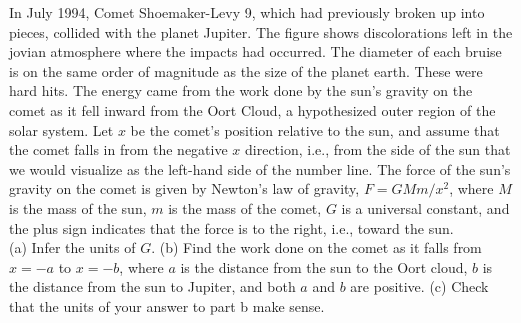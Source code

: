 In July 1994, Comet Shoemaker-Levy 9, which had previously broken up into pieces,
collided with the planet Jupiter.
The figure shows discolorations left in the jovian atmosphere where the impacts
had occurred. The diameter of each bruise is on the same order of magnitude as
the size of the planet earth. These were hard hits. The energy came from the work
done by the sun's gravity on the comet as it fell inward from the Oort Cloud, a
hypothesized outer region of the solar system. Let $x$ be the comet's position
relative to the sun, and assume that the comet falls in from the negative $x$ direction,
i.e., from the side of the sun that we would visualize as the left-hand side of the
number line. 
The force of the sun's gravity on the comet is given by Newton's law of gravity,
$F = GMm/x^2$,
where $M$ is the mass of the sun, $m$ is the mass of the comet,
$G$ is a universal constant, and the plus sign indicates that the force is
to the right, i.e., toward the sun.\\
(a) Infer the units of $G$.
(b) Find the work done on the comet as it falls from $x=-a$ to $x=-b$, where $a$ is the distance
from the sun to the Oort cloud, $b$ is the distance from the sun to Jupiter, and both $a$ and
$b$ are positive.
(c) Check that the units of your answer to part b make sense.\answercheck
